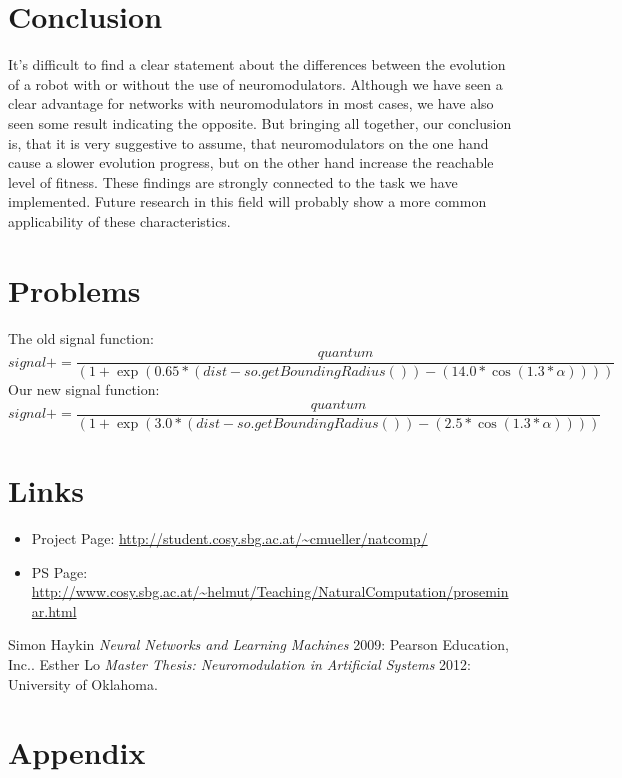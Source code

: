 \documentclass[12pt,fleqn,a4paper]{article}
\begin{document}
\section{Conclusion}
It's difficult to find a clear statement about the differences between the evolution of a robot with or without the use of neuromodulators. Although we have seen a clear advantage for networks with neuromodulators in most cases, we have also seen some result indicating the opposite. But bringing all together, our conclusion is, that it is very suggestive to assume, that neuromodulators on the one hand cause a slower evolution progress, but on the other hand increase the reachable level of fitness. These findings are strongly connected to the task we have implemented. Future research in this field will probably show a more common applicability of these characteristics.

\section{Problems}
The old signal function:
\[signal += \frac{quantum}{(1 + \exp(0.65 * (dist - so.getBoundingRadius()) - (14.0 * \cos(1.3 * \alpha))))}\]
Our new signal function:
\[signal += \frac{quantum}{(1 + \exp(3.0 * (dist - so.getBoundingRadius()) - (2.5 * \cos(1.3 * \alpha))))}\]

\newpage
\section{Links}

\begin{itemize}
\item Project Page: \url{http://student.cosy.sbg.ac.at/~cmueller/natcomp/}
\item PS Page: \url{http://www.cosy.sbg.ac.at/~helmut/Teaching/NaturalComputation/proseminar.html}
\end{itemize}


\begin{thebibliography}{1}
Simon Haykin {\em Neural Networks and Learning Machines} 2009: Pearson Education, Inc..
Esther Lo {\em Master Thesis: Neuromodulation in Artificial Systems} 2012: University of Oklahoma.
\end{thebibliography}


\section{Appendix}
\end{document}
